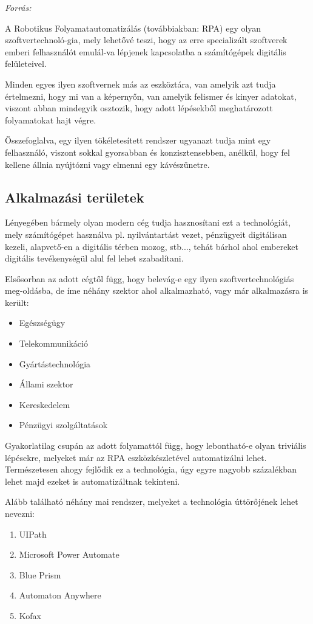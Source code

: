 \textit{Forrás: \cite{book:heuristic}}


A Robotikus Folyamatautomatizálás (továbbiakban: RPA) egy olyan szoftvertechnoló\hyp{}gia, mely lehetővé teszi, hogy az erre specializált szoftverek emberi felhasználót emulál\hyp{}va lépjenek kapcsolatba a számítógépek digitális felületeivel.

Minden egyes ilyen szoftvernek más az eszköztára, van amelyik azt tudja értelmezni, hogy mi van a képernyőn, van amelyik felismer és kinyer adatokat, viszont abban mindegyik osztozik, hogy adott lépésekből meghatározott folyamatokat hajt végre.

Összefoglalva, egy ilyen tökéletesített rendszer ugyanazt tudja mint egy felhasználó, viszont sokkal gyorsabban és konzisztensebben, anélkül, hogy fel kellene állnia nyújtózni vagy elmenni egy kávészünetre.

\subsection{Alkalmazási területek}

Lényegében bármely olyan modern cég tudja hasznosítani ezt a technológiát, mely számítógépet használva pl. nyilvántartást vezet, pénzügyeit digitálisan kezeli, alapvető\hyp{}en a digitális térben mozog, stb..., tehát bárhol ahol embereket digitális tevékenységül alul fel lehet szabadítani.

Elsősorban az adott cégtől függ, hogy belevág-e egy ilyen szoftvertechnológiás meg\hyp{}oldásba, de íme néhány szektor ahol alkalmazható, vagy már alkalmazásra is került:
\begin{itemize}
	\item Egészségügy
	\item Telekommunikáció
	\item Gyártástechnológia
	\item Állami szektor
	\item Kereskedelem
	\item Pénzügyi szolgáltatások
\end{itemize}

Gyakorlatilag csupán az adott folyamattól függ, hogy lebontható-e olyan triviális lépésekre, melyeket már az RPA eszközkészletével automatizálni lehet. Természetesen ahogy fejlődik ez a technológia, úgy egyre nagyobb százalékban lehet majd ezeket is automatizáltnak tekinteni.

Alább található néhány mai rendszer, melyeket a technológia úttörőjének lehet nevezni:
\begin{enumerate}
	\item UIPath
	\item Microsoft Power Automate
	\item Blue Prism
	\item Automaton Anywhere
	\item Kofax
\end{enumerate}

